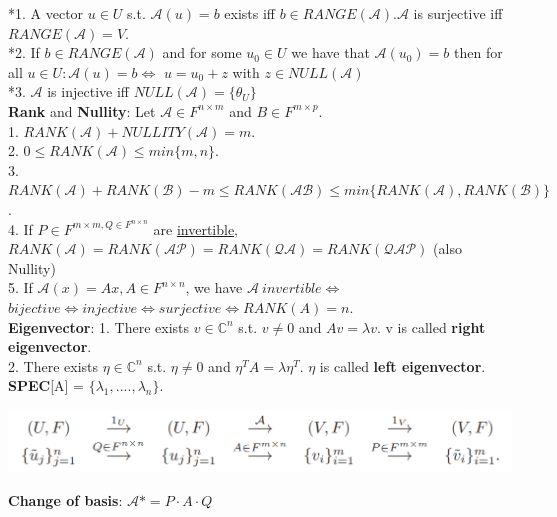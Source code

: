 \documentclass[10pt,landscape]{article}
\newenvironment{Figure}
{\par\medskip\noindent\minipage{\linewidth}}
{\endminipage\par\medskip}
\begin{document}
\begin{multicols*}{4}
*1. A vector $u \in U$ s.t. $\mathcal{A}(u) = b$ exists iff $b \in RANGE(\mathcal{A}). \mathcal{A}$ is  surjective iff $RANGE(\mathcal{A})=V.$\\
*2. If $b \in RANGE(\mathcal{A})$ and for some $u_0 \in U$ we have that $\mathcal{A}(u_0) = b$ then for all $u \in U: \mathcal{A}(u)=b \Leftrightarrow $  $ u = u_0 + z$ with $z\in NULL(\mathcal{A})$ \\
*3. $\mathcal{A}$ is injective iff $NULL(\mathcal{A})=\{ \theta_U \}$\\

\textbf{Rank} and \textbf{Nullity}: Let $\mathcal{A} \in F^{n \times m}$ and $B \in F^{m \times p}$.\\
1. $RANK(\mathcal{A}) + NULLITY(\mathcal{A}) = m$.\\
2. $0 \leq RANK(\mathcal{A}) \leq min\{m,n\}$.\\
3. $ RANK(\mathcal{A}) + RANK(\mathcal{B}) - m \leq RANK(\mathcal{AB}) \leq min\{RANK(\mathcal{A}), RANK(\mathcal{B})\}$.\\
4. If $P \in F^{m\times m, Q \in F^{n \times n}}$ are \underline{invertible},\\
 $RANK(\mathcal{A}) = RANK(\mathcal{AP}) =RANK(\mathcal{QA}) =RANK(\mathcal{QAP})$ (also Nullity)\\
5. If $\mathcal{A}(x)=Ax, A \in F^{n \times n}$, we have 
$\mathcal{A}\ invertible \Leftrightarrow $ $bijective \Leftrightarrow injective \Leftrightarrow surjective \Leftrightarrow RANK(A) = n$.\\
 
\textbf{Eigenvector}: 
1. There exists $v \in \mathbb{C}^n$ s.t. $v \neq 0$ and $Av = \lambda v$. v is called \textbf{right eigenvector}.\\
2. There exists $\eta \in \mathbb{C}^n$ s.t. $\eta \neq 0$ and $\eta ^T A = \lambda \eta ^T$. $ \eta$ is called \textbf{left eigenvector}.\\

\textbf{SPEC}[A] = $\{ \lambda_1,....,\lambda_n\}.$\\

\begin{Figure}
	\centering
	\includegraphics[width=\linewidth]{pictures/basis.png}
\end{Figure}


\textbf{Change of basis}: $ \mathcal{A}* = P \cdot A \cdot Q $


\end{multicols*}
\end{document}
